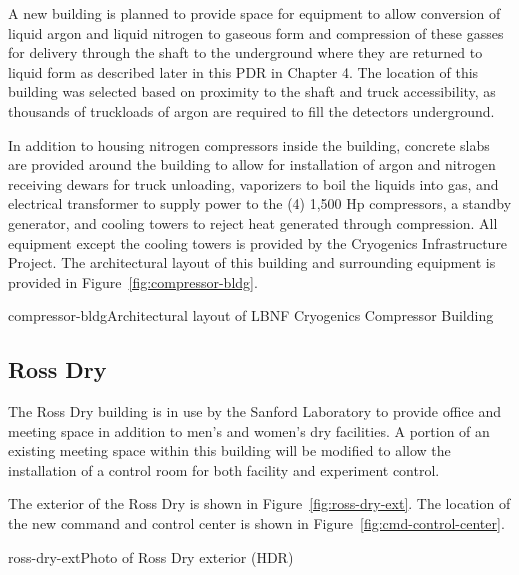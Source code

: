 A new building is planned to provide space for equipment to allow conversion of liquid argon and liquid nitrogen to gaseous form and compression of these gasses for delivery through the shaft to the underground where they are returned to liquid form as described later in this PDR in Chapter 4.  The location of this building was selected based on proximity to the shaft and truck accessibility, as thousands of truckloads of argon are required to fill the detectors underground.

In addition to housing nitrogen compressors inside the building, concrete slabs are provided around the building to allow for installation of argon and nitrogen receiving dewars for truck unloading, vaporizers to boil the liquids into gas, and electrical transformer to supply power to the (4) 1,500 Hp compressors, a standby generator, and cooling towers to reject heat generated through compression.  All equipment except the cooling towers is provided by the Cryogenics Infrastructure Project. The architectural layout of this building and surrounding equipment is provided in Figure~\ref{fig:compressor-bldg}.

\begin{cdrfigure}{compressor-bldg}{Architectural layout of LBNF Cryogenics Compressor Building}
\end{cdrfigure}


\subsection{Ross Dry}
\label{sec:fscf-surf-facil-surface-bldg-rossdry}

The Ross Dry building is in use by the Sanford Laboratory to provide office and meeting space in addition to men's and women's dry facilities. A portion of an existing meeting space within this building will be modified to allow the installation of a control room for both facility and experiment control.

The exterior of the Ross Dry is shown in Figure~\ref{fig:ross-dry-ext}.  The location of the new command and control center is shown in Figure~\ref{fig:cmd-control-center}.

\begin{cdrfigure}{ross-dry-ext}{Photo of Ross Dry exterior (HDR)}
\end{cdrfigure}

